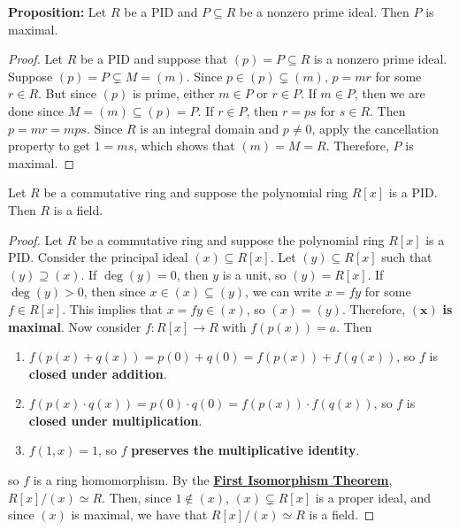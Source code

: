 \documentclass [12pt] {article}
\newenvironment{corollary}[1]{\begin{tcolorbox}[title={Corollary #1}]}{\end{tcolorbox}}
\renewcommand{\href}[2]{\hyperref[#1]{\bf{\underline{{#2}}}}}
\renewcommand{\bf}[1]{\textbf{{#1}}}
\begin{document}
\bf{Proposition:} Let $R$ be a PID and $P \subseteq R$ be a nonzero prime ideal. Then $P$ is
maximal.
\begin{proof}
    Let $R$ be a PID and suppose that $(p) = P \subseteq R$ is a nonzero prime ideal. Suppose
    $(p) = P \subsetneq M = (m)$. Since $p \in (p) \subsetneq (m)$, $p = mr$ for some $r \in R$.
    But since $(p)$ is prime, either $m \in P$ or $r \in P$. If $m \in P$, then we are done since
    $M = (m) \subseteq (p) = P$. If $r \in P$, then $r = ps$ for $s \in R$. Then
    $p = mr = mps$. Since $R$ is an integral domain and $p \neq 0$, apply the cancellation property
    to get $1 = ms$, which shows that $(m) = M = R$. Therefore, $P$ is maximal.
\end{proof}

\newpage
\begin{corollary}{}
    Let $R$ be a commutative ring and suppose the polynomial ring $R[x]$ is a PID. Then $R$ is a
    field.
\end{corollary}
\begin{proof}
    Let $R$ be a commutative ring and suppose the polynomial ring $R[x]$ is a PID. Consider the
    principal ideal $(x) \subseteq R[x]$. Let $(y) \subseteq R[x]$ such that $(y) \supseteq (x)$.
    If $\deg(y) = 0$, then $y$ is a unit, so $(y) = R[x]$. If $\deg(y) > 0$, then since
    $x \in (x) \subseteq (y)$, we can write $x = fy$ for some $f \in R[x]$. This implies that
    $x = fy \in (x)$, so $(x) = (y)$. Therefore, $\bm{(x)}$ \bf{is maximal}. Now consider
    $f : R[x] \to R$ with $f(p(x)) = a$. Then
    \begin{enumerate}[label=(\arabic*)]
        \item $f(p(x) + q(x)) = p(0) + q(0) = f(p(x)) + f(q(x))$, so $f$ is \bf{closed under addition}.
        \item $f(p(x) \cdot q(x)) = p(0) \cdot q(0) = f(p(x)) \cdot f(q(x))$, so $f$ is
            \bf{closed under multiplication}.
        \item $f(1, x) = 1$, so $f$ \bf{preserves the multiplicative identity}.
    \end{enumerate}
    so $f$ is a ring homomorphism. By the \href{thm:isothm}{First Isomorphism Theorem},
    $R[x]/(x) \simeq R$. Then, since $1 \not \in (x)$, $(x) \subsetneq R[x]$ is a
    proper ideal, and since $(x)$ is maximal, we have that $R[x]/(x) \simeq R$ is a field.
\end{proof}
\end{document}
